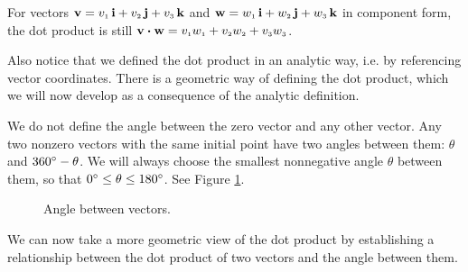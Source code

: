 For vectors $\textbf{v} = v_{\scriptscriptstyle 1}\,\textbf{i} + v_{\scriptscriptstyle 2}\,\textbf{j} + v_{\scriptscriptstyle 3}\,\textbf{k}$ and $\textbf{w} = w_{\scriptscriptstyle 1}\,\textbf{i} + w_{\scriptscriptstyle 2}\,\textbf{j} + w_{\scriptscriptstyle 3}\,\textbf{k}$ in component form, the dot product is
still $\textbf{v} \bm{\cdot} \textbf{w} = v_{\scriptscriptstyle 1}w_{\scriptscriptstyle 1} + v_{\scriptscriptstyle 2}w_{\scriptscriptstyle 2} +
v_{\scriptscriptstyle 3}w_{\scriptscriptstyle 3}$.

Also notice that we defined the dot product in an analytic way, i.e. by referencing vector coordinates. There is
a geometric way of defining the dot product, which we will now develop as a consequence of the analytic
definition.


We do not define the angle between the zero vector and any other vector.
Any two nonzero vectors with the same initial point have two angles between them: $\theta$ and $360^\circ - \theta$.
We will always choose the smallest nonnegative angle $\theta$ between them, so that $0^\circ \leq \theta \leq
180^\circ$. See Figure \ref{fig:angle}.

\begin{figure}[h]
 \centering
 \qquad
 \qquad
 \caption[]{\quad Angle between vectors.}
 \label{fig:angle}
\end{figure}

We can now take a more geometric view of
the dot product by establishing a relationship between the dot product of two vectors and the angle between them.

